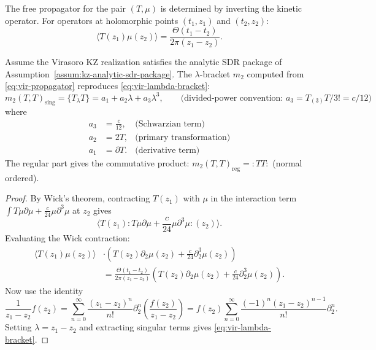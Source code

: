 The free propagator for the pair $(T, \mu)$ is determined by inverting the kinetic operator. For operators at holomorphic points $(t_1, z_1)$ and $(t_2, z_2)$:
\begin{equation}
\langle T(z_1) \mu(z_2) \rangle = \frac{\Theta(t_1 - t_2)}{2\pi(z_1 - z_2)}.
\end{equation}

\begin{proposition}
Assume the Virasoro KZ realization satisfies the analytic SDR package
of Assumption~\textup{\ref{assum:kz-analytic-sdr-package}}.
The $\lambda$-bracket $m_2$ computed from \eqref{eq:vir-propagator} reproduces \eqref{eq:vir-lambda-bracket}:
\begin{equation}
m_2(T, T)_\text{sing} = \{T_\lambda T\} = a_1 + a_2 \lambda + a_3 \lambda^3,
 \qquad\text{(divided-power convention: $a_3 = T_{(3)}T/3! = c/12$)}
\end{equation}
where
\begin{align}
a_3 &= \frac{c}{12}, & \text{(Schwarzian term)}\\
a_2 &= 2T, & \text{(primary transformation)}\\
a_1 &= \partial T. & \text{(derivative term)}
\end{align}
The regular part gives the commutative product: $m_2(T,T)_\text{reg} = :TT:$ (normal ordered).
\end{proposition}

\begin{proof}
By Wick's theorem, contracting $T(z_1)$ with $\mu$ in the interaction term $\int T\mu\partial\mu + \frac{c}{24}\mu\partial^3\mu$ at $z_2$ gives
\[
\langle T(z_1) : T\mu\partial\mu + \frac{c}{24}\mu\partial^3\mu :(z_2) \rangle.
\]
Evaluating the Wick contraction:
\begin{align*}
\langle T(z_1) \mu(z_2) \rangle &\cdot \left( T(z_2) \partial_2 \mu(z_2) + \frac{c}{24} \partial_2^3 \mu(z_2) \right)\\
&= \frac{\Theta(t_1-t_2)}{2\pi(z_1-z_2)} \left( T(z_2) \partial_2 \mu(z_2) + \frac{c}{24} \partial_2^3 \mu(z_2) \right).
\end{align*}
Now use the identity
\[
\frac{1}{z_1 - z_2} f(z_2) = \sum_{n=0}^\infty \frac{(z_1-z_2)^n}{n!} \partial_2^n \left( \frac{f(z_2)}{z_1-z_2} \right) = f(z_2) \sum_{n=0}^\infty \frac{(-1)^n (z_1-z_2)^{n-1}}{n!} \partial_2^n.
\]
Setting $\lambda = z_1 - z_2$ and extracting singular terms gives \eqref{eq:vir-lambda-bracket}.
\end{proof}

